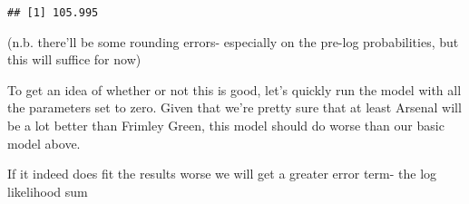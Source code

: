 \documentclass[]{article}
\newenvironment{Shaded}{\begin{snugshade}}{\end{snugshade}}
\newcommand{\KeywordTok}[1]{\textcolor[rgb]{0.13,0.29,0.53}{\textbf{#1}}}
\newcommand{\DecValTok}[1]{\textcolor[rgb]{0.00,0.00,0.81}{#1}}
\newcommand{\StringTok}[1]{\textcolor[rgb]{0.31,0.60,0.02}{#1}}
\newcommand{\OperatorTok}[1]{\textcolor[rgb]{0.81,0.36,0.00}{\textbf{#1}}}
\newcommand{\NormalTok}[1]{#1}
\begin{document}
\begin{Shaded}
\end{Shaded}

\begin{verbatim}
## [1] 105.995
\end{verbatim}

(n.b. there'll be some rounding errors- especially on the pre-log
probabilities, but this will suffice for now)

To get an idea of whether or not this is good, let's quickly run the
model with all the parameters set to zero. Given that we're pretty sure
that at least Arsenal will be a lot better than Frimley Green, this
model should do worse than our basic model above.

If it indeed does fit the results worse we will get a greater error
term- the log likelihood sum
\end{document}
